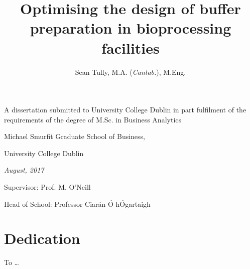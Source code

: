 \documentclass[a4paper,12pt,bibtotoc,oneside]{book} %
\numberwithin{equation}{section}
\numberwithin{figure}{chapter}
\begin{document}
\frontmatter 

\title
{Optimising the design of buffer preparation in bioprocessing facilities}

\author{Sean Tully, M.A. (\emph{Cantab.}), M.Eng.}

\maketitle

{\normalsize 
\vfill
\begin{center} 
\textup{A dissertation submitted to University College Dublin in part
fulfilment of the requirements of the degree of M.Sc. in Business Analytics}
\end{center}
\vfill
\begin{center} 
Michael Smurfit Graduate School of Business,
\end{center}
\begin{center} 
University College Dublin
\end{center}
\vfill
\begin{center} 
\textit{August, 2017}
\end{center}
\vfill
\begin{center} 
\textup{Supervisor: Prof. M. O'Neill}
\end{center}
\vfill
\begin{center} 
\textup{Head of School: Professor Ciar\'an \'O h\'Ogartaigh}
\end{center}
\vfill
}

\thispagestyle{empty}

\clearpage

\chapter*{Dedication} 
To \ldots


\cleardoublepage
\tableofcontents
\clearpage

\listoffigures{}
\clearpage

\listoftables{}




\end{document}
